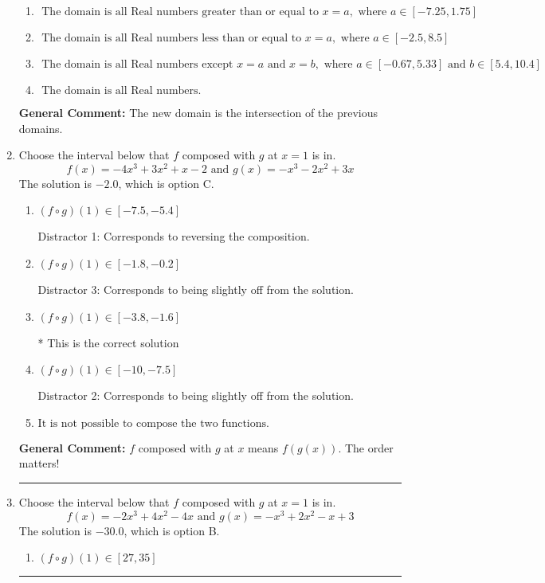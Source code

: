 \documentclass{extbook}[14pt]
\newcommand{\litem}[1]{\item #1

\rule{\textwidth}{0.4pt}}
\begin{document}
\begin{enumerate}
{\begin{enumerate}[label=\Alph*.]
\item \( \text{ The domain is all Real numbers greater than or equal to } x = a, \text{ where } a \in [-7.25, 1.75] \)


\item \( \text{ The domain is all Real numbers less than or equal to } x = a, \text{ where } a \in [-2.5, 8.5] \)


\item \( \text{ The domain is all Real numbers except } x = a \text{ and } x = b, \text{ where } a \in [-0.67, 5.33] \text{ and } b \in [5.4, 10.4] \)


\item \( \text{ The domain is all Real numbers. } \)


\end{enumerate}

\textbf{General Comment:} The new domain is the intersection of the previous domains.
}
\litem{
Choose the interval below that $f$ composed with $g$ at $x=1$ is in.
\[ f(x) = -4x^{3} +3 x^{2} +x -2 \text{ and } g(x) = -x^{3} -2 x^{2} +3 x \]The solution is \( -2.0 \), which is option C.\begin{enumerate}[label=\Alph*.]
\item \( (f \circ g)(1) \in [-7.5, -5.4] \)

 Distractor 1: Corresponds to reversing the composition.
\item \( (f \circ g)(1) \in [-1.8, -0.2] \)

 Distractor 3: Corresponds to being slightly off from the solution.
\item \( (f \circ g)(1) \in [-3.8, -1.6] \)

* This is the correct solution
\item \( (f \circ g)(1) \in [-10, -7.5] \)

 Distractor 2: Corresponds to being slightly off from the solution.
\item \( \text{It is not possible to compose the two functions.} \)


\end{enumerate}

\textbf{General Comment:} $f$ composed with $g$ at $x$ means $f(g(x))$. The order matters!
}
\litem{
Choose the interval below that $f$ composed with $g$ at $x=1$ is in.
\[ f(x) = -2x^{3} +4 x^{2} -4 x \text{ and } g(x) = -x^{3} +2 x^{2} -x + 3 \]The solution is \( -30.0 \), which is option B.\begin{enumerate}[label=\Alph*.]
\item \( (f \circ g)(1) \in [27, 35] \)


\end{enumerate}}
\end{enumerate}
\end{document}
